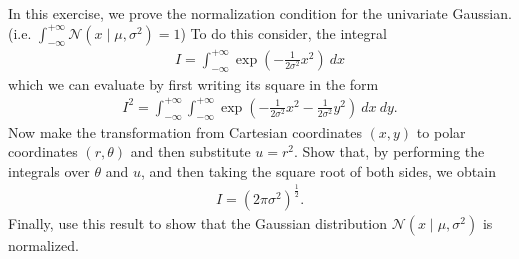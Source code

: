 \begin{question}{1.7}
	In this exercise, we prove the normalization condition for the univariate Gaussian. (i.e. $\int_{-\infty}^{+\infty} \mathcal{N}(x \mid \mu, \sigma^2) = 1$) To do this consider, the integral
	\begin{align*}
		I = \int_{-\infty}^{+\infty} \exp\left(-\frac{1}{2\sigma^2}x^2\right)\ dx
	\end{align*}
	which we can evaluate by first writing its square in the form
	\begin{align*}
		I^2 = \int_{-\infty}^{+\infty}\int_{-\infty}^{+\infty} \exp\left(-\frac{1}{2\sigma^2}x^2 -\frac{1}{2\sigma^2}y^2\right)\ dx\ dy.
	\end{align*}
	Now make the transformation from Cartesian coordinates $(x,y)$ to polar coordinates $(r, \theta)$ and then substitute $u = r^2$. Show that, by performing the integrals over $\theta$ and $u$, and then taking the square root of both sides, we obtain
	\begin{align*}
		I = \left(2\pi\sigma^2\right)^{\frac{1}{2}}.
	\end{align*}
	Finally, use this result to show that the Gaussian distribution $\mathcal{N}(x \mid \mu, \sigma^2)$ is normalized.
\end{question}

